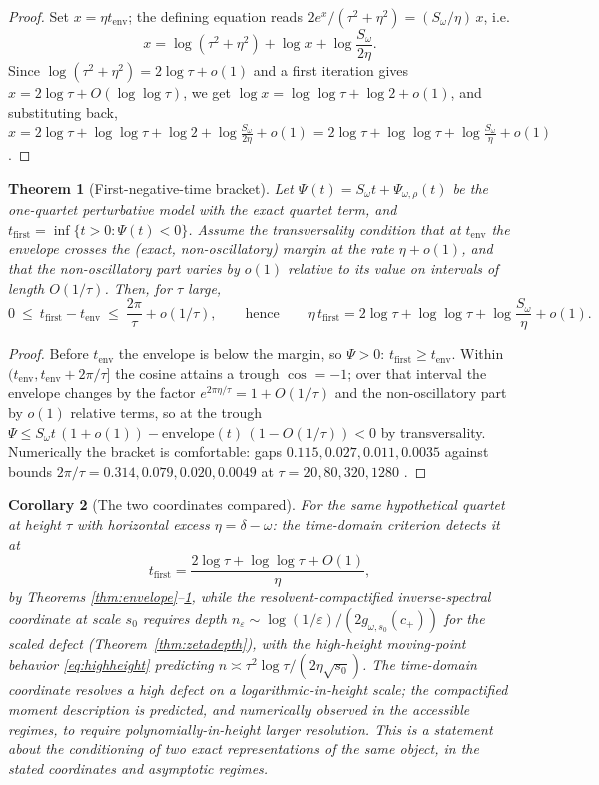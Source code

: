 \documentclass[11pt]{amsart}
\newtheorem{theorem}{Theorem}[section]
\newtheorem{corollary}[theorem]{Corollary}
\theoremstyle{definition}
\theoremstyle{remark}
\newcommand{\eps}{\varepsilon}
\begin{document}
\begin{proof}
Set $x=\eta t_{\mathrm{env}}$; the defining equation reads
$2e^x/(\tau^2+\eta^2)=(S_\omega/\eta)\,x$, i.e.
\[
x=\log(\tau^2+\eta^2)+\log x+\log\frac{S_\omega}{2\eta}.
\]
Since $\log(\tau^2+\eta^2)=2\log\tau+o(1)$ and a first iteration gives
$x=2\log\tau+O(\log\log\tau)$, we get
$\log x=\log\log\tau+\log2+o(1)$, and substituting back,
$x=2\log\tau+\log\log\tau+\log2+\log\frac{S_\omega}{2\eta}+o(1)
=2\log\tau+\log\log\tau+\log\frac{S_\omega}{\eta}+o(1)$.
\end{proof}

\begin{theorem}[First-negative-time bracket]\label{thm:bracket}
Let $\Psi(t)=S_\omega t+\Psi_{\omega,\rho}(t)$ be the one-quartet
perturbative model with the exact quartet term, and
$t_{\mathrm{first}}=\inf\{t>0:\Psi(t)<0\}$. Assume the transversality
condition that at $t_{\mathrm{env}}$ the envelope crosses the (exact,
non-oscillatory) margin at the rate $\eta+o(1)$, and that the
non-oscillatory part varies by $o(1)$ relative to its value on intervals of
length $O(1/\tau)$. Then, for $\tau$ large,
\[
0\ \le\ t_{\mathrm{first}}-t_{\mathrm{env}}\ \le\ \frac{2\pi}\tau
+o(1/\tau),
\qquad\text{hence}\qquad
\eta\,t_{\mathrm{first}}
=2\log\tau+\log\log\tau+\log\frac{S_\omega}{\eta}+o(1).
\]
\end{theorem}

\begin{proof}
Before $t_{\mathrm{env}}$ the envelope is below the margin, so
$\Psi>0$: $t_{\mathrm{first}}\ge t_{\mathrm{env}}$. Within
$(t_{\mathrm{env}},t_{\mathrm{env}}+2\pi/\tau]$ the cosine attains a trough
$\cos=-1$; over that interval the envelope changes by the factor
$e^{2\pi\eta/\tau}=1+O(1/\tau)$ and the non-oscillatory part by $o(1)$
relative terms, so at the trough
$\Psi\le S_\omega t\,(1+o(1))-\text{envelope}(t)\,(1-O(1/\tau))<0$ by
transversality. Numerically the bracket is comfortable: gaps
$0.115,0.027,0.011,0.0035$ against bounds $2\pi/\tau=
0.314,0.079,0.020,0.0049$ at $\tau=20,80,320,1280$ \cite{LabRecord}.
\end{proof}

\begin{corollary}[The two coordinates compared]\label{cor:compare}
For the same hypothetical quartet at height $\tau$ with horizontal excess
$\eta=\delta-\omega$: the time-domain criterion detects it at
\[
t_{\mathrm{first}}=\frac{2\log\tau+\log\log\tau+O(1)}{\eta},
\]
by Theorems \ref{thm:envelope}--\ref{thm:bracket}, while the
resolvent-compactified inverse-spectral coordinate at scale $s_0$ requires
depth $n_\eps\sim\log(1/\eps)/(2g_{\omega,s_0}(c_+))$ for the scaled defect
(Theorem~\ref{thm:zetadepth}), with the high-height moving-point behavior
\eqref{eq:highheight} predicting $n\asymp\tau^2\log\tau/(2\eta\sqrt{s_0})$.
The time-domain coordinate resolves a high defect on a logarithmic-in-height
scale; the compactified moment description is predicted, and numerically
observed in the accessible regimes, to require polynomially-in-height larger
resolution. This is a statement about the conditioning of two exact
representations of the same object, in the stated coordinates and asymptotic
regimes.
\end{corollary}
\end{document}
